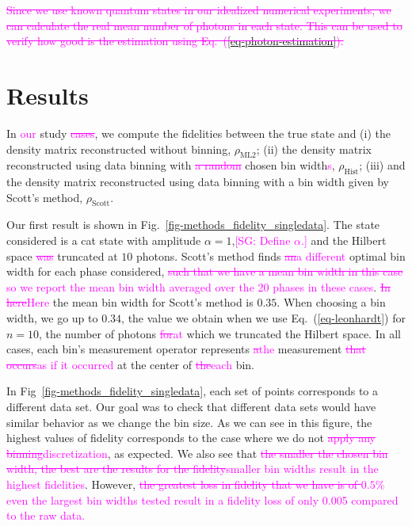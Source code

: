 \documentclass[
reprint,
superscriptaddress,
showpacs,
amsmath,
amssymb,
aps,
pra,
longbibliography
]{revtex4-1}
\providecommand{\aucmnt}[1]{#1}
\providecommand{\editcolor}[2]{\textcolor{#1}{#2}}
\providecommand{\aucmnt}[1]{}
\providecommand{\editcolor}[2]{#2}
\newcommand{\SG}[1]{\editcolor{magenta}{#1}}
\newcommand{\SGs}[1]{\aucmnt{\editcolor{magenta}{\sout{#1}}}}
\newcommand{\SGc}[1]{\aucmnt{\editcolor{magenta}{[SG: #1]}}}
\begin{document}
\SGs{ Since we use known quantum states in our idealized numerical
  experiments, we can calculate the real mean number of photons in
  each state. This can be used to verify how good is the estimation
  using Eq.~(\ref{eq-photon-estimation}).}



\section{Results}
In \SG{our} study \SGs{cases}, we compute the fidelities between the
true state and (i) the density matrix reconstructed without binning,
$\rho_{\mathrm{ML2}}$; (ii) the density matrix reconstructed using
data binning with \SGs{a random} chosen bin width\SG{s},
$\rho_{\mathrm{Hist}}$; (iii) and the density matrix reconstructed
using data binning with a bin width given by Scott's method,
$\rho_{\mathrm{Scott}}$.

Our first result is shown in
Fig.~\ref{fig-methods_fidelity_singledata}. The state considered is a
cat state with amplitude $\alpha = 1$,\SGc{Define $\alpha$.}  and the
Hilbert space \SGs{was} truncated at $10$ photons. Scott's method
finds \SGs{an}\SG{a different} optimal bin width for each phase
considered, \SGs{such that we have a mean bin width in this case}
\SG{so we report the mean bin width averaged over the 20 phases in
  these cases}. \SGs{In here}\SG{Here} the mean bin width for Scott's
method is $0.35$. When choosing a bin width, we go up to $0.34$, the
value we obtain when we use Eq.~(\ref{eq-leonhardt}) for $n=10$, the
number of photons \SGs{for}\SG{at} which we truncated the Hilbert
space. In all cases, each bin's measurement operator represents
\SGs{a}\SG{the} measurement \SGs{that occurs}\SG{as if it occurred} at
the center of \SGs{the}\SG{each} bin.
 
In Fig~\ref{fig-methods_fidelity_singledata}, each set of points
corresponds to a different data set. Our goal was to check that
different data sets would have similar behavior as we change the bin
size. As we can see in this figure, the highest values of fidelity
corresponds to the case where we do not \SGs{apply any
  binning}\SG{discretization}, as expected. We also see that \SGs{the
  smaller the chosen bin width, the best are the results for the
  fidelity}\SG{smaller bin widths result in the highest
  fidelities}. However, \SGs{the greatest loss in fidelity that we
  have is of $0.5\%$} \SG{even the largest bin widths tested result in
  a fidelity loss of only 0.005 compared to the raw data.}
\end{document}

